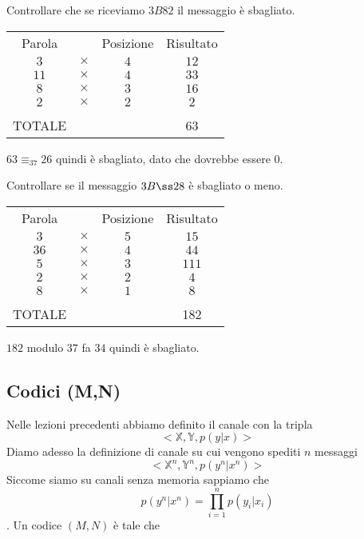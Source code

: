\documentclass[12pt]{report}
\begin{document}
    \begin{es}
        Controllare che se riceviamo $3B82$ il messaggio è sbagliato.
        \vspace{10px}
        \begin{center}
            \begin{tabular}{cccc}
                Parola & & Posizione & Risultato \\
                $3$ & $\times$ & $4$ & $12$ \\
                $11$ & $\times$ & $4$ & $33$ \\
                $8$ & $\times$ & $3$ & $16$ \\
                $2$ & $\times$ & $2$ & $2$ \\
                & &  &  \\
                TOTALE & &  & 63  \\
            \end{tabular}
        \end{center}

        \noindent
        $63 \equiv_{37} 26$ quindi è sbagliato, dato che dovrebbe essere $0$.
    \end{es}

    \begin{es}
        Controllare se il messaggio $3B\ss28$ è sbagliato o meno.
        \vspace{10px}
        \begin{center}
            \begin{tabular}{cccc}
                Parola & & Posizione & Risultato \\
                $3$ & $\times$ & $5$ & $15$ \\
                $36$ & $\times$ & $4$ & $44$ \\
                $5$ & $\times$ & $3$ & $111$ \\
                $2$ & $\times$ & $2$ & $4$ \\
                $8$ & $\times$ & $1$ & $8$ \\
                & &  &  \\
                TOTALE & &  & 182  \\
            \end{tabular}
        \end{center}
        $182$ modulo $37$ fa $34$ quindi è sbagliato.
    \end{es}

    \subsection{Codici (M,N)}
    Nelle lezioni precedenti abbiamo definito il canale con la tripla
    $$<\mathbb{X},\mathbb{Y},p(y|x)>$$
    Diamo adesso la definizione di canale su cui vengono spediti $n$ messaggi
    $$<\mathbb{X}^n,\mathbb{Y}^n,p(y^n|x^n)>$$
    Siccome siamo su canali senza memoria sappiamo che
    $$p(y^n|x^n) = \prod_{i=1}^n p(y_i|x_i)$$. Un codice $(M,N)$ è tale che
\end{document}
